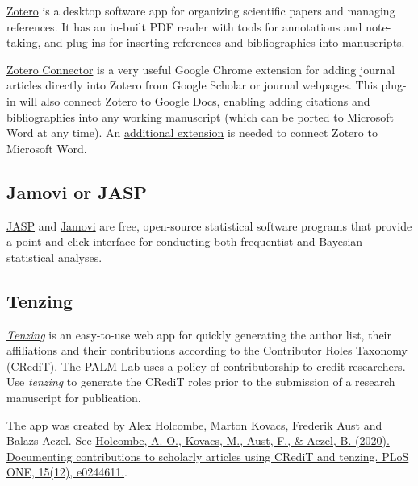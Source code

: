 \documentclass[
]{book}
\begin{document}
\href{https://www.zotero.org/}{Zotero} is a desktop software app for organizing scientific papers and managing references. It has an in-built PDF reader with tools for annotations and note-taking, and plug-ins for inserting references and bibliographies into manuscripts.

\href{https://www.zotero.org/download/connectors}{Zotero Connector} is a very useful Google Chrome extension for adding journal articles directly into Zotero from Google Scholar or journal webpages. This plug-in will also connect Zotero to Google Docs, enabling adding citations and bibliographies into any working manuscript (which can be ported to Microsoft Word at any time). An \href{https://www.zotero.org/support/word_processor_plugin_usage}{additional extension} is needed to connect Zotero to Microsoft Word.

\hypertarget{jamovi-or-jasp}{%
\subsection*{Jamovi or JASP}\label{jamovi-or-jasp}}

\href{https://jasp-stats.org/}{JASP} and \href{https://www.jamovi.org/}{Jamovi} are free, open-source statistical software programs that provide a point-and-click interface for conducting both frequentist and Bayesian statistical analyses.

\hypertarget{tenzing}{%
\subsection*{Tenzing}\label{tenzing}}

\href{https://tenzing.club}{\emph{Tenzing}} is an easy-to-use web app for quickly generating the author list, their affiliations and their contributions according to the Contributor Roles Taxonomy (CRediT). The PALM Lab uses a \protect\hyperlink{contributorship}{policy of contributorship} to credit researchers. Use \emph{tenzing} to generate the CRediT roles prior to the submission of a research manuscript for publication.

The app was created by Alex Holcombe, Marton Kovacs, Frederik Aust and Balazs Aczel. See \href{https://journals.plos.org/plosone/article?id=10.1371/journal.pone.0244611}{Holcombe, A. O., Kovacs, M., Aust, F., \& Aczel, B. (2020). Documenting contributions to scholarly articles using CRediT and tenzing. PLoS ONE, 15(12), e0244611.}.
\end{document}

